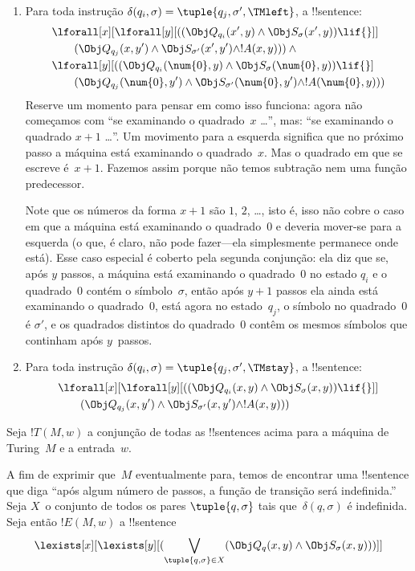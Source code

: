 \documentclass[../../../include/open-logic-section]{subfiles}
\begin{document}
\begin{enumerate}
\begin{enumerate}
\item {} Para toda instrução $\delta(q_i, \sigma) =
  \tuple{q_j, \sigma', \TMleft}$, a !!{sentence}:
\begin{align*}
& \lforall[x][\lforall[y][
    ((\Obj Q_{q_i}(x', y) \land \Obj S_{\sigma}(x', y)) \lif {}]]\\
& \qquad   (\Obj Q_{q_j}(x, y') \land \Obj S_{\sigma'}(x', y') \land
!A(x, y))) \land {}\\
& \lforall[y][((\Obj Q_{q_i}(\num{0}, y) \land \Obj S_{\sigma}(\num{0},
    y)) \lif {}]\\
& \qquad (\Obj Q_{q_j}(\num{0}, y') \land \Obj S_{\sigma'}(\num{0},
  y') \land !A(\num{0}, y)))
\end{align*}
Reserve um momento para pensar em como isso funciona: agora não
começamos com ``se examinando o quadrado~$x$ \dots'', mas: ``se
examinando o quadrado $x+1$ \dots''. Um movimento para a esquerda
significa que no próximo passo a máquina está examinando o
quadrado~$x$.  Mas o quadrado em que se escreve é~$x+1$.  Fazemos
assim porque não temos subtração nem uma função predecessor.

Note que os números da forma $x+1$ são $1$, $2$, \dots, isto é, isso
não cobre o caso em que a máquina está examinando o quadrado~$0$ e
deveria mover-se para a esquerda (o que, é claro, não pode fazer---ela
simplesmente permanece onde está). Esse caso especial é coberto pela
segunda conjunção: ela diz que se, após $y$ passos, a máquina está
examinando o quadrado~$0$ no estado $q_i$ e o quadrado~$0$ contém o
símbolo~$\sigma$, então após $y+1$ passos ela ainda está examinando o
quadrado~$0$, está agora no estado~$q_j$, o símbolo no quadrado~$0$ é
$\sigma'$, e os quadrados distintos do quadrado~$0$ contêm os mesmos
símbolos que continham após $y$~passos.
\item {} Para toda instrução $\delta(q_i, \sigma) =
  \tuple{q_j, \sigma', \TMstay}$, a !!{sentence}:
\begin{align*}
& \lforall[x][\lforall[y][(
   (\Obj Q_{q_i}(x, y) \land \Obj S_{\sigma}(x, y)) \lif {}]] \\
&\qquad   (\Obj Q_{q_j}(x, y') \land \Obj S_{\sigma'}(x, y') \land
!A(x, y)))
\end{align*}
\end{enumerate}
\end{enumerate}
Seja $!T(M, w)$ a conjunção de todas as !!{sentence}s acima para a
máquina de Turing~$M$ e a entrada~$w$.

A fim de exprimir que~$M$ eventualmente para, temos de encontrar uma
!!{sentence} que diga ``após algum número de passos, a função de
transição será indefinida.''  Seja $X$~o conjunto de todos os pares
$\tuple{q, \sigma}$ tais que~$\delta(q, \sigma)$ é indefinida.  Seja
então $!E(M, w)$ a !!{sentence}
\[
\lexists[x][\lexists[y][(\bigvee_{\tuple{q, \sigma} \in
      X}(\Obj Q_q(x, y) \land \Obj S_\sigma(x, y)))]]
\]
\end{document}
